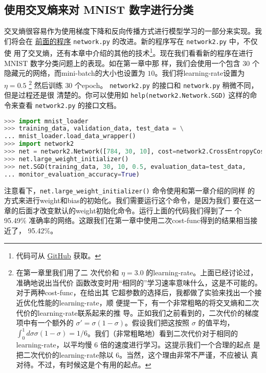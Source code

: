 \subsection{使用交叉熵来对 MNIST 数字进行分类}

交叉熵很容易作为使用梯度下降和反向传播方式进行模型学习的一部分来实现。我们将会在
\hyperref[sec:implementing_our_network_to_classify_digits]{前面的程序}
\lstinline!network.py! 的改进。新的程序写在 \lstinline!network2.py!  中，不仅使
用了交叉熵，还有本章中介绍的其他的技术\footnote{代码可从
  \href{https://github.com/mnielsen/neural-networks-and-deep-learning/blob/master/src/network2.py}{GitHub}
  获取。}。现在我们看看新的程序在进行 MNIST 数字分类问题上的表现。如在第一章中那
样，我们会使用一个包含 $30$ 个隐藏元的网络，而\gls*{mini-batch}的大小也设置为
$10$。我们将\gls*{learning-rate}设置为 $\eta=0.5$ \footnote{在第一章里我们用了二
  次代价和 $\eta = 3.0$ 的\gls*{learning-rate}。上面已经讨论过，准确地说出当代价
  函数改变时用“相同的”学习速率意味什么，这是不可能的。对于两种\gls*{cost-func}，在给出其
  它超参数的选择后，我都做了实验来找出一个接近优化性能的\gls*{learning-rate}，顺
  便提一下，有一个非常粗略的将交叉熵和二次代价的\gls*{learning-rate}联系起来的推
  导。正如我们之前看到的，二次代价的梯度项中有一个额外的 $\sigma' =
  \sigma(1-\sigma)$。假设我们把这按照 $\sigma$ 的值平均，$\int_0^1 d\sigma
  \sigma(1-\sigma) = 1/6$。我们（非常粗略地）看到二次代价对于相同的%
  \gls*{learning-rate}，以平均慢 $6$ 倍的速度进行学习。这提示我们一个合理的起点
  是把二次代价的\gls*{learning-rate}除以 $6$。当然，这个理由非常不严谨，不应被认
  真对待。不过，有时候这是个有用的起点。} 然后训练 $30$ 个\gls*{epoch}。
\lstinline!network2.py! 的接口和 \lstinline!network.py! 稍微不同，但是过程还是很
清楚的。你可以使用如 \lstinline!help(network2.Network.SGD)! 这样的命令来查看
\lstinline!network2.py! 的接口文档。

\begin{lstlisting}[language=Python]
>>> import mnist_loader
>>> training_data, validation_data, test_data = \
... mnist_loader.load_data_wrapper()
>>> import network2
>>> net = network2.Network([784, 30, 10], cost=network2.CrossEntropyCost)
>>> net.large_weight_initializer()
>>> net.SGD(training_data, 30, 10, 0.5, evaluation_data=test_data,
... monitor_evaluation_accuracy=True)
\end{lstlisting}

注意看下，\lstinline!net.large_weight_initializer()! 命令使用和第一章介绍的同样
的方式来进行\gls*{weight}和\gls*{bias}的初始化。我们需要运行这个命令，是因为我们
要在这一章的后面才改变默认的\gls*{weight}初始化命令。运行上面的代码我们得到了一
个 95.49\% 准确率的网络。这跟我们在第一章中使用二次\gls*{cost-func}得到的结果相当接近了，
95.42\%。


